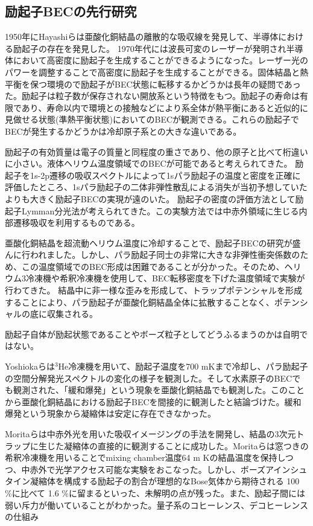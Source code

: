 \subsection{励起子BECの先行研究}
1950年にHayashiらは亜酸化銅結晶の離散的な吸収線を発見して、半導体における励起子の存在を発見した。
1970年代には波長可変のレーザーが発明され半導体において高密度に励起子を生成することができるようになった。レーザー光のパワーを調整することで高密度に励起子を生成することができる。固体結晶と熱平衡を保つ環境ので励起子がBEC状態に転移するかどうかは長年の疑問であった。励起子は粒子数が保存されない開放系という特徴をもつ。励起子の寿命は有限であり、寿命以内で環境との接触などにより系全体が熱平衡にあると近似的に見做せる状態(準熱平衡状態)においてのBECが観測できる。これらの励起子でBECが発生するかどうかは冷却原子系との大きな違いである。

励起子の有効質量は電子の質量と同程度の重さであり、他の原子と比べて桁違いに小さい。液体ヘリウム温度領域でのBECが可能であると考えられてきた。
励起子を1s-2p遷移の吸収スペクトルによって1sパラ励起子の温度と密度を正確に評価したところ、1sパラ励起子の二体非弾性散乱による消失が当初予想していたよりも大きく励起子BECの実現が遠のいた。
励起子の密度の評価方法として励起子Lymman分光法が考えられてきた。この実験方法では中赤外領域に生じる内部遷移吸収を利用するものである。

亜酸化銅結晶を超流動ヘリウム温度に冷却することで、励起子BECの研究が盛んに行われました。しかし、パラ励起子同士の非常に大きな非弾性衝突係数のため、この温度領域でのBEC形成は困難であることが分かった。そのため、ヘリウム3冷凍機や希釈冷凍機を使用して、BEC転移密度を下げた温度領域で実験が行わてきた。
結晶中に非一様な歪みを形成して、トラップポテンシャルを形成することにより、パラ励起子が亜酸化銅結晶全体に拡散することなく、ポテンシャルの底に収集される。

励起子自体が励起状態であることやボーズ粒子としてどうふるまうのかは自明ではない。

Yoshiokaら\cite{Yoshioka2011}は$^3\text{He}$冷凍機を用いて、励起子温度を700 mKまで冷却し、パラ励起子の空間分解発光スペクトルの変化の様子を観測した。そして水素原子のBECでも観測された、「緩和爆発」という現象を亜酸化銅結晶でも観測した。このことから亜酸化銅結晶における励起子BECを間接的に観測したと結論づけた。緩和爆発という現象から凝縮体は安定に存在できなかった。

Moritaら\cite{Morita2022}は中赤外光を用いた吸収イメージングの手法を開発し、結晶の3次元トラップに生じた凝縮体の直接的に観測することに成功した。Moritaらは窓つきの希釈冷凍機を用いることでmixing chamber温度64 m Kの結晶温度を保持しつつ、中赤外で光学アクセス可能な実験をおこなった。しかし、ボーズアインシュタイン凝縮体を構成する励起子の割合が理想的なBose気体から期待される 100 \%に比べて 1.6 \%に留まるといった、未解明の点が残った。また、励起子間には弱い斥力が働いていることがわかった。量子系のコヒーレンス、デコヒーレンスの仕組み

